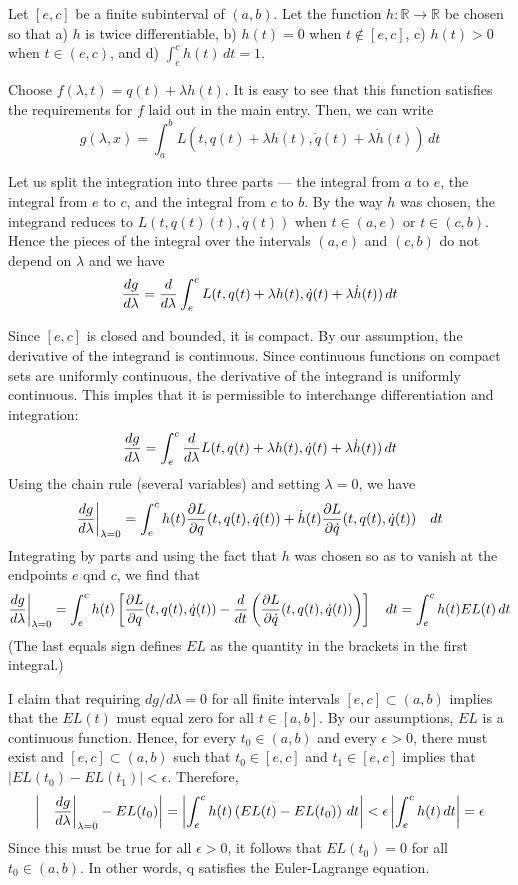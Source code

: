 \documentclass[12pt]{article}
\begin{document}
Let $[e,c]$ be a finite subinterval of $(a,b)$.  Let the function $h \colon \mathbb{R} \to \mathbb{R}$ be chosen so that a) $h$ is twice differentiable, b) $h(t) = 0$ when $t \notin [e,c]$, c) $h(t) > 0$ when $t \in (e,c)$, and d) $\int_e^c h(t) \, dt = 1$.

Choose $f(\lambda,t) = q(t) + \lambda h (t)$.  It is easy to see that this function satisfies the requirements for $f$ laid out in the main entry.  Then, we can write
 $$g(\lambda, x) = \int_a^b L (t, q(t) + \lambda h (t), \dot{q}(t) + \lambda \dot{h} (t)) \, dt$$

Let us split the integration into three parts --- the integral from $a$ to $e$, the integral from $e$ to $c$, and the integral from $c$ to $b$.  By the way $h$ was chosen, the integrand reduces to $L (t, q(t) (t), \dot{q}(t))$ when $t \in (a,e)$ or $t \in (c,b)$.  Hence the pieces of the integral over the intervals $(a,e)$ and $(c,b)$ do not depend on $\lambda$ and we have
 $${dg \over d\lambda} = {d \over d\lambda} \int_e^c L (t, q(t) + \lambda h (t), \dot{q}(t) + \lambda \dot{h} (t)) \, dt$$

Since $[e,c]$ is closed and bounded, it is compact.  By our assumption, the derivative of the integrand is continuous.  Since continuous functions on compact sets are uniformly continuous, the derivative of the integrand is uniformly continuous.  This imples that it is permissible to interchange differentiation and integration:
 $${dg \over d\lambda} = \int_e^c {d \over d\lambda} L (t, q(t) + \lambda h (t), \dot{q}(t) + \lambda \dot{h} (t)) \, dt$$
Using the chain rule (several variables) and setting $\lambda = 0$, we have
 $${dg \over d\lambda} \bigg|_{\lambda = 0} = \int_e^c h (t) {\partial L  \over \partial q} (t, q(t),\dot{q}(t)) + \dot{h} (t) \frac{\partial L}{\partial \dot{q}} (t, q(t),\dot{q}(t)) \quad dt$$
Integrating by parts and using the fact that $h$ was chosen so as to vanish at the endpoints $e$ qnd $c$, we find that
 $${dg \over d\lambda} \bigg|_{\lambda = 0} = \int_e^c h (t) \left[ {\partial L  \over \partial q} (t, q(t),\dot{q}(t)) - {d \over d t} \left( \frac{\partial L}{\partial \dot{q}} (t, q(t),\dot{q}(t)) \right) \right] \quad dt = \int_e^c h (t) EL(t) \, dt$$
(The last equals sign defines $EL$ as the quantity in the brackets in the first integral.)

I claim that requiring $dg / d\lambda = 0$ for all finite intervals $[e,c] \subset (a,b)$ implies that the $EL(t)$ must equal zero for all $t \in [a,b]$.  By our assumptions, $EL$ is a continuous function.  Hence, for every $t_0 \in (a,b)$ and every $\epsilon > 0$, there must exist and $[e,c] \subset (a,b)$ such that $t_0 \in [e,c]$ and $t_1 \in [e,c]$ implies that $|EL(t_0) - EL(t_1)| < \epsilon$.  Therefore,
 $$\left| \quad {dg \over d\lambda} \bigg|_{\lambda = 0} - EL(t_0) \right| = \left| \int_e^c h (t) \left( EL(t) - EL(t_0) \right) \, dt \right| < \epsilon \left| \int_e^c h (t) \, dt \right| = \epsilon$$
Since this must be true for all $\epsilon > 0$, it follows that $EL(t_0) = 0$ for all $t_0 \in (a,b)$.  In other words, q satisfies the Euler-Lagrange equation.
\end{document}
